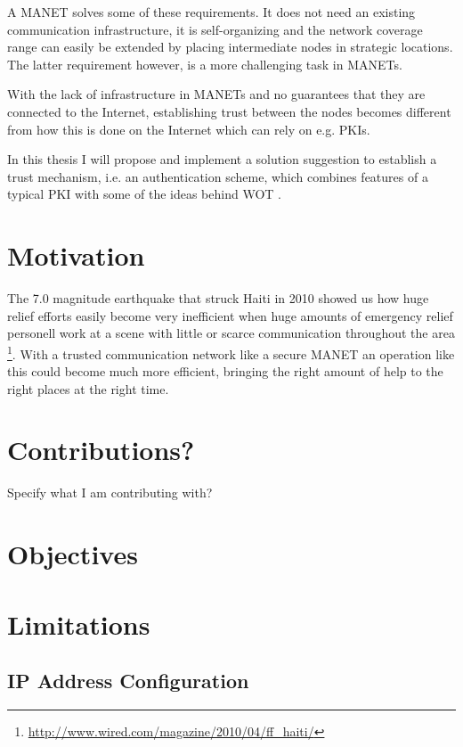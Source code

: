 A \ac{MANET} solves some of these requirements. It does not need an existing
communication infrastructure, it is self-organizing and the network coverage
range can easily be extended by placing intermediate nodes in strategic
locations. The latter requirement however, is a more challenging task in
\acp{MANET}.

With the lack of infrastructure in \acp{MANET} and no guarantees that they are
connected to the Internet, establishing trust between the nodes becomes
different from how this is done on the Internet which can rely on e.g.
\acp{PKI}.

In this thesis I will propose and implement a solution suggestion to establish a
trust mechanism, i.e. an authentication scheme, which combines features of a
typical \ac{PKI} with some of the ideas behind \ac{WOT}
\cite{zimmermann1995official}.


\section{Motivation}
The 7.0 magnitude earthquake that struck Haiti in 2010 showed us how huge
relief efforts easily become very inefficient when huge amounts of emergency
relief personell work at a scene with little or scarce communication throughout
the area \footnote{\url{http://www.wired.com/magazine/2010/04/ff_haiti/}}. With
a trusted communication network like a secure \ac{MANET} an operation like this
could become much more efficient, bringing the right amount of help to the
right places at the right time.

\section{Contributions?}
Specify what I am contributing with?

\section{Objectives}

\section{Limitations}

\subsection{IP Address Configuration}
\label{limit:ip_address_conf}

